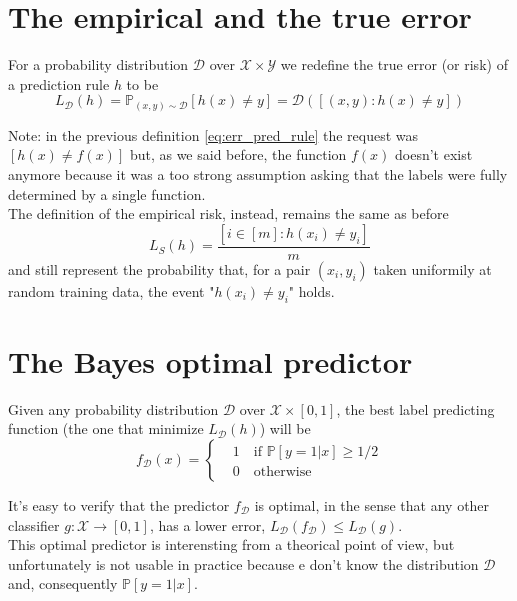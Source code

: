 \documentclass[12pt]{report}
\theoremstyle{plain}
\newcommand\mcl[1]{\mathcal{#1}}
\begin{document}
\begin{flushleft}
\section{The empirical and the true error}
For a probability distribution $\mcl{D}$ over $\mcl{X}\times\mcl{Y}$ we redefine the true error (or risk) of a prediction rule $h$ to be
\begin{equation}
L_\mcl{D}(h) = \mathds{P}_{(x,y)\sim\mcl{D}}[h(x)\neq y] = \mcl{D}([(x,y):h(x)\neq y])
\label{eq:true_err_D}
\end{equation}

Note: in the previous definition \ref{eq:err_pred_rule} the request was $[h(x)\neq f(x)]$ but, as we said before, the function $f(x)$ doesn't exist anymore because it was a too strong assumption asking that the labels were fully determined by a single function.\\
The definition of the empirical risk, instead, remains the same as before
\[ L_S(h)=\frac{[i\in[m]:h(x_i)\neq y_i]}{m} \]
and still represent the probability that, for a pair $(x_i,y_i)$ taken uniformily at random training data, the event "$h(x_i)\neq y_i$" holds.

\section{The Bayes optimal predictor}
Given any probability distribution $\mcl{D}$ over $\mcl{X}\times [0,1]$, the best label predicting function (the one that minimize $L_\mcl{D}(h)$) will be
\begin{equation}
f_\mcl{D}(x) = \left\{\begin{aligned} &1\quad \text{if  } \mathds{P}[y=1|x]\geq 1/2\\ &0\quad \text{otherwise}\end{aligned}\right.
\label{eq:bayes_predictor}
\end{equation}

It's easy to verify that the predictor $f_\mcl{D}$ is optimal, in the sense that any other classifier $g:\mcl{X}\to [0,1]$, has a lower error, $L_\mcl{D}(f_\mcl{D})\leq L_\mcl{D}(g)$.\\
This optimal predictor is interensting from a theorical point of view, but unfortunately is not usable in practice because e don't know the distribution $\mcl{D}$ and, consequently $\mathds{P}[y=1|x]$.\\



\end{flushleft}
\end{document}
